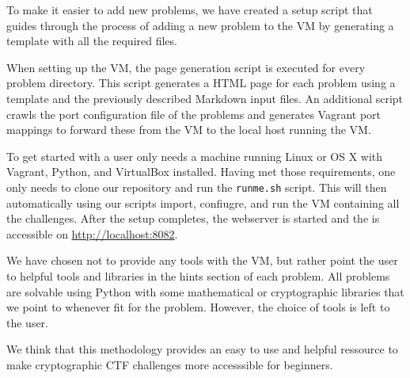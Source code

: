 To make it easier to add new problems, we have created a setup script that guides through the process of adding a new problem to the VM by generating a template with all the required files.

When setting up the VM, the page generation script is executed for every problem directory. This script generates a HTML page for each problem using a template and the previously described Markdown input files. An additional script crawls the port configuration file of the problems and generates Vagrant port mappings to forward these from the VM to the local host running the VM.

To get started with \cvm a user only needs a machine running Linux or OS X with Vagrant, Python, and VirtualBox installed. Having met those requirements, one only needs to clone our repository and run the \verb|runme.sh| script. This will then automatically using our scripts import, confiugre, and run the VM containing all the challenges. After the setup completes, the webserver is started and the \cvm  is accessible on \url{http://localhost:8082}. 

We have chosen not to provide any tools with the VM, but rather point the user to helpful tools and libraries in the hints section of each problem. All problems are solvable using Python with some mathematical or cryptographic libraries that we point to whenever fit for the problem. However, the choice of tools is left to the user.

We think that this methodology provides an easy to use and helpful ressource to make cryptographic CTF challenges more accesssible for beginners.

